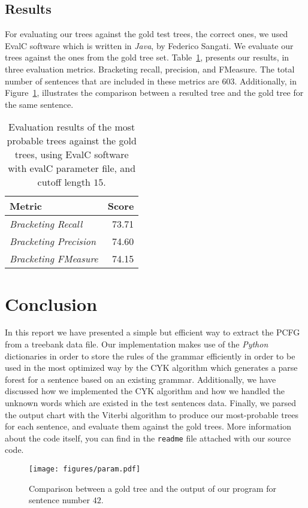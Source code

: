 \documentclass[a4paper,11pt]{article}
\begin{document}
\subsection{Results}
For evaluating our trees against the gold test trees, the correct ones, we used EvalC software which is written in \textit{Java}, by Federico Sangati. We evaluate our trees against the ones from the gold tree set. Table~\ref{metric}, presents our results, in three evaluation metrics. Bracketing recall, precision, and FMeasure. The total number of sentences that are included in these metrics are $603$. Additionally, in Figure~\ref{last}, illustrates the comparison between a resulted tree and the gold tree for the same sentence.

\begin{table}[t!]
\caption{Evaluation results of the most probable trees against the gold trees, using EvalC software with evalC parameter file, and cutoff length $15$.}
\label{metric}
\begin{center}
    \begin{tabular}{l r}
    \hline
    \hline
    \textbf{Metric} & \textbf{Score}  \\ \hline
	\emph{Bracketing Recall}        &  73.71 \\
	\emph{Bracketing Precision}     &  74.60 \\
	\emph{Bracketing FMeasure}      &  74.15 \\
  \hline
  \end{tabular}
  \end{center}
\end{table}


\section{Conclusion}
\label{concl}
In this report we have presented a simple but efficient way to extract the PCFG from a treebank data file. Our implementation makes use of the \textit{Python} dictionaries in order to store the rules of the grammar efficiently in order to be used in the most optimized way by the CYK algorithm which generates a parse forest for a sentence based on an existing grammar.
 Additionally, we have discussed how we implemented the CYK algorithm and how we handled the unknown words which are existed in the test sentences data. 
 Finally, we parsed the output chart with the Viterbi algorithm to produce our most-probable trees for each sentence, and evaluate them against the gold trees.
 More information about the code itself, you can find in the \texttt{readme} file attached with our source code.
 
  
\begin{figure}[t!]
  \caption{Comparison between a gold tree and the output of our program for sentence number $42$.}
  \label{last}
  \centering
    \texttt{[image: figures/param.pdf]}
\end{figure}
\end{document}
